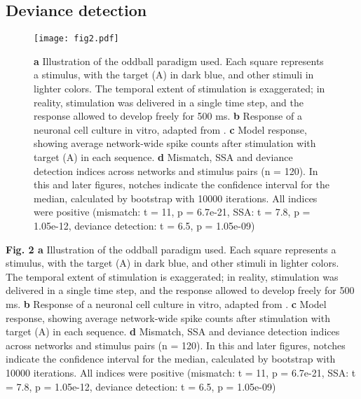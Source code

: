 \documentclass[pdflatex,referee,iicol,sn-basic]{sn-jnl}
\theoremstyle{thmstyleone}%
\theoremstyle{thmstyletwo}%
\theoremstyle{thmstylethree}%
\begin{document}
\subsection{Deviance detection}\label{sec-dd}

\begin{figure*}%
    \centering
    \texttt{[image: fig2.pdf]}
    \caption{\textbf{a} Illustration of the oddball paradigm used. Each square represents a stimulus, with the target (A) in dark blue, and other stimuli in lighter colors. The temporal extent of stimulation is exaggerated; in reality, stimulation was delivered in a single time step, and the response allowed to develop freely for 500 ms. \textbf{b} Response of a neuronal cell culture in vitro, adapted from \cite{Kubota2021-dx}. \textbf{c} Model response, showing average network-wide spike counts after stimulation with target (A) in each sequence. \textbf{d} Mismatch, SSA and deviance detection indices across networks and stimulus pairs (n = 120). In this and later figures, notches indicate the confidence interval for the median, calculated by bootstrap with 10000 iterations. All indices were positive (mismatch: t = 11, p = 6.7e-21, SSA: t = 7.8, p = 1.05e-12, deviance detection: t = 6.5, p = 1.05e-09)}
    \label{fig2}
\end{figure*}

\textbf{Fig. 2 a} Illustration of the oddball paradigm used. Each square represents a stimulus, with the target (A) in dark blue, and other stimuli in lighter colors. The temporal extent of stimulation is exaggerated; in reality, stimulation was delivered in a single time step, and the response allowed to develop freely for 500 ms. \textbf{b} Response of a neuronal cell culture in vitro, adapted from \cite{Kubota2021-dx}. \textbf{c} Model response, showing average network-wide spike counts after stimulation with target (A) in each sequence. \textbf{d} Mismatch, SSA and deviance detection indices across networks and stimulus pairs (n = 120). In this and later figures, notches indicate the confidence interval for the median, calculated by bootstrap with 10000 iterations. All indices were positive (mismatch: t = 11, p = 6.7e-21, SSA: t = 7.8, p = 1.05e-12, deviance detection: t = 6.5, p = 1.05e-09)
\end{document}
